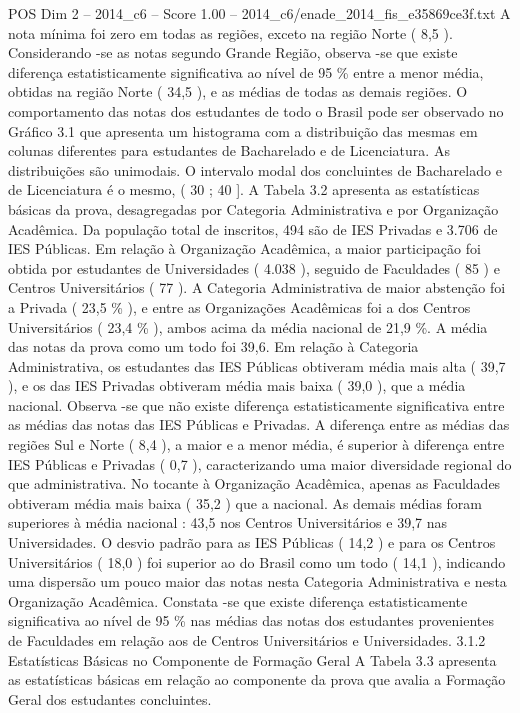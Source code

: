\begin{textsample}{POS Dim 2 – 2014\_c6 – Score 1.00 – 2014\_c6/enade\_2014\_fis\_e35869ce3f.txt}
A nota mínima foi zero em todas as regiões, exceto na região Norte ( 8,5 ).
Considerando -se as notas segundo Grande Região, observa -se que existe diferença estatisticamente significativa ao nível de 95 \% entre a menor média, obtidas na região Norte ( 34,5 ), e as médias de todas as demais regiões.
O comportamento das notas dos estudantes de todo o Brasil pode ser observado no Gráfico 3.1 que apresenta um histograma com a distribuição das mesmas em colunas diferentes para estudantes de Bacharelado e de Licenciatura.
As distribuições são unimodais.
O intervalo modal dos concluintes de Bacharelado e de Licenciatura é o mesmo, ( 30 ; 40 ].
A Tabela 3.2 apresenta as estatísticas básicas da prova, desagregadas por Categoria Administrativa e por Organização Acadêmica.
Da população total de inscritos, 494 são de IES Privadas e 3.706 de IES Públicas.
Em relação à Organização Acadêmica, a maior participação foi obtida por estudantes de Universidades ( 4.038 ), seguido de Faculdades ( 85 ) e Centros Universitários ( 77 ).
A Categoria Administrativa de maior abstenção foi a Privada ( 23,5 \% ), e entre as Organizações Acadêmicas foi a dos Centros Universitários ( 23,4 \% ), ambos acima da média nacional de 21,9 \%.
A média das notas da prova como um todo foi 39,6.
Em relação à Categoria Administrativa, os estudantes das IES Públicas obtiveram média mais alta ( 39,7 ), e os das IES Privadas obtiveram média mais baixa ( 39,0 ), que a média nacional.
Observa -se que não existe diferença estatisticamente significativa entre as médias das notas das IES Públicas e Privadas.
A diferença entre as médias das regiões Sul e Norte ( 8,4 ), a maior e a menor média, é superior à diferença entre IES Públicas e Privadas ( 0,7 ), caracterizando uma maior diversidade regional do que administrativa.
No tocante à Organização Acadêmica, apenas as Faculdades obtiveram média mais baixa ( 35,2 ) que a nacional.
As demais médias foram superiores à média nacional : 43,5 nos Centros Universitários e 39,7 nas Universidades.
O desvio padrão para as IES Públicas ( 14,2 ) e para os Centros Universitários ( 18,0 ) foi superior ao do Brasil como um todo ( 14,1 ), indicando uma dispersão um pouco maior das notas nesta Categoria Administrativa e nesta Organização Acadêmica.
Constata -se que existe diferença estatisticamente significativa ao nível de 95 \% nas médias das notas dos estudantes provenientes de Faculdades em relação aos de Centros Universitários e Universidades. 3.1.2 Estatísticas Básicas no Componente de Formação Geral A Tabela 3.3 apresenta as estatísticas básicas em relação ao componente da prova que avalia a Formação Geral dos estudantes concluintes.

\end{textsample}
